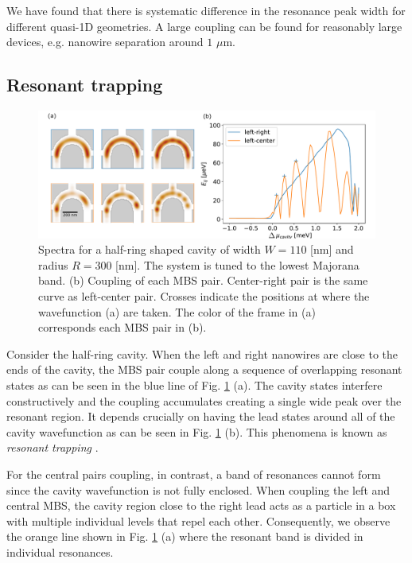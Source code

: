 We have found that there is systematic difference in the resonance peak width for different quasi-1D geometries.
A large coupling can be found for reasonably large devices, e.g. nanowire separation around $1$ $\mu$m.

\subsection{Resonant trapping}

\begin{figure}[h!]
\centering
  \includegraphics[width=\linewidth]{figures/resonant_trapping_ring.pdf}
  \caption{Spectra for a half-ring shaped cavity of width $W=110$ [nm] and radius $R=300$ [nm]. The system is tuned to the lowest Majorana band. (b) Coupling of each MBS pair. Center-right pair is the same curve as left-center pair. Crosses indicate the positions at where the wavefunction (a) are taken. The color of the frame in (a) corresponds each MBS pair in (b).}
  \label{fig:resonant_trapping}
\end{figure}

Consider the half-ring cavity.
When the left and right nanowires are close to the ends of the cavity, the MBS pair couple along a sequence of overlapping resonant states as can be seen in the blue line of Fig. \ref{fig:resonant_trapping} (a).
The cavity states interfere constructively and the coupling accumulates creating a single wide peak over the resonant region.
It depends crucially on having the lead states around all of the cavity wavefunction as can be seen in Fig. \ref{fig:resonant_trapping} (b).
This phenomena is known as \textit{resonant trapping} \cite{Nazmitdinov2001,Nazmitdinov2002}.

For the central pairs coupling, in contrast, a band of resonances cannot form since the cavity wavefunction is not fully enclosed.
When coupling the left and central MBS, the cavity region close to the right lead acts as a particle in a box with multiple individual levels that repel each other.
Consequently, we observe the orange line shown in Fig. \ref{fig:resonant_trapping} (a) where the resonant band is divided in individual resonances.

